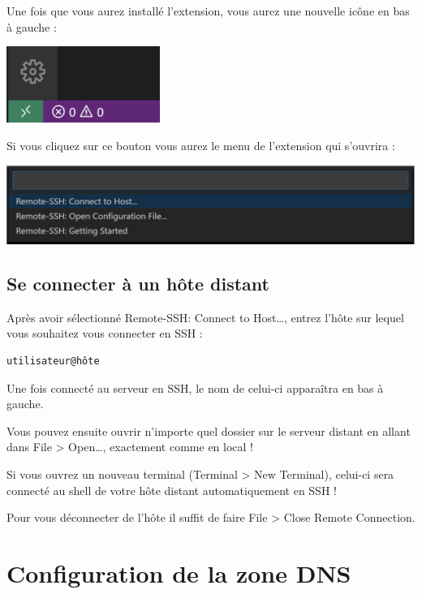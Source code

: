 \documentclass{article}
\begin{document}
Une fois que vous aurez installé l'extension, vous aurez une nouvelle icône en bas à gauche :
\begin{center}
\includegraphics[width=5cm]{images/image10.png}
\end{center}

Si vous cliquez sur ce bouton vous aurez le menu de l'extension qui s'ouvrira :
\begin{center}
\includegraphics[width=15cm]{images/image11.png}
\end{center}

\subsection{Se connecter à un hôte distant}
Après avoir sélectionné Remote-SSH: Connect to Host…, entrez l'hôte sur lequel vous souhaitez vous connecter en SSH :
\begin{verbatim}
utilisateur@hôte
\end{verbatim}

Une fois connecté au serveur en SSH, le nom de celui-ci apparaîtra en bas à gauche.

Vous pouvez ensuite ouvrir n'importe quel dossier sur le serveur distant en allant dans File > Open…, exactement comme en local !

Si vous ouvrez un nouveau terminal (Terminal > New Terminal), celui-ci sera connecté au shell de votre hôte distant automatiquement en SSH !

Pour vous déconnecter de l'hôte il suffit de faire File > Close Remote Connection.

\section{Configuration de la zone DNS}
\end{document}
